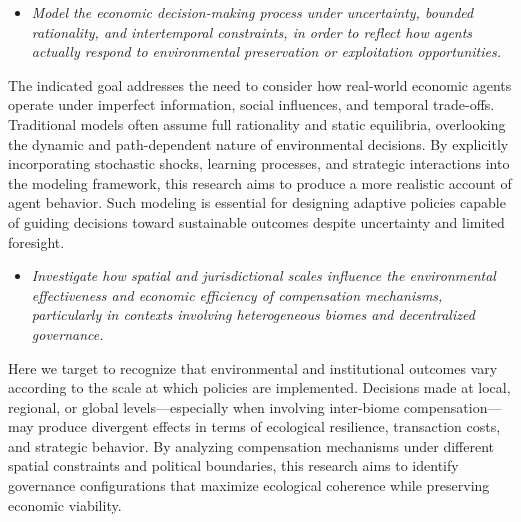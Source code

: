 \begin{itemize}

    \item[\textbf{G2.}] 
    
    \textit{Model the economic decision-making process under uncertainty, bounded rationality, and intertemporal constraints, in order to reflect how agents actually respond to environmental preservation or exploitation opportunities.}
    
\end{itemize}

The indicated goal addresses the need to consider how real-world economic agents operate under imperfect information, social influences, and temporal trade-offs. Traditional models often assume full rationality and static equilibria, overlooking the dynamic and path-dependent nature of environmental decisions. By explicitly incorporating stochastic shocks, learning processes, and strategic interactions into the modeling framework, this research aims to produce a more realistic account of agent behavior. Such modeling is essential for designing adaptive policies capable of guiding decisions toward sustainable outcomes despite uncertainty and limited foresight.

\begin{itemize}

    \item[\textbf{G3.}] 
    
    \textit{Investigate how spatial and jurisdictional scales influence the environmental effectiveness and economic efficiency of compensation mechanisms, particularly in contexts involving heterogeneous biomes and decentralized governance.}
    
\end{itemize}

Here we target to recognize that environmental and institutional outcomes vary according to the scale at which policies are implemented. Decisions made at local, regional, or global levels—especially when involving inter-biome compensation—may produce divergent effects in terms of ecological resilience, transaction costs, and strategic behavior. By analyzing compensation mechanisms under different spatial constraints and political boundaries, this research aims to identify governance configurations that maximize ecological coherence while preserving economic viability.

